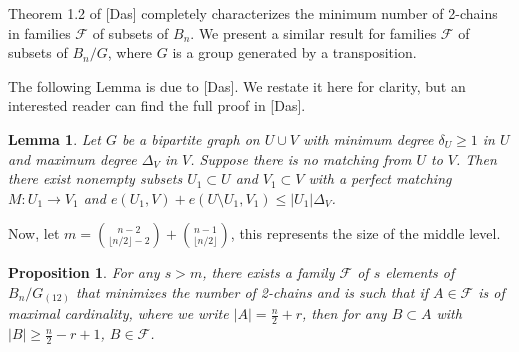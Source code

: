 \documentclass[12pt]{article}
\theoremstyle{plain}
\newtheorem{lemma}[theorem]{Lemma}
\newtheorem{proposition}[theorem]{Proposition}
\theoremstyle{definition}
\theoremstyle{remark}
\newcommand{\F}{\mathcal{F}}
\begin{document}

Theorem 1.2 of [Das] completely characterizes the minimum number of 2-chains in families $\F$ of subsets of $B_n$. We present a similar result for families $\F$ of subsets of $B_n / G$, where $G$ is a group generated by a transposition.


The following Lemma is due to [Das]. We restate it here for clarity, but an interested reader can find the full proof in [Das].

\begin{lemma}
\label{lemma2}
Let $G$ be a bipartite graph on $U \cup V$ with minimum degree $\delta_U \geq 1$ in $U$ and maximum degree $\Delta_V$ in $V$. Suppose there is no matching from $U$ to $V$. Then there exist nonempty subsets $U_1 \subset U$ and $V_1 \subset V$ with a perfect matching $M: U_1 \to V_1$ and $e(U_1,V) + e(U \setminus U_1,V_1) \leq |U_1| \Delta_V$.
\end{lemma}

Now, let $m = \binom{n-2}{\lfloor n/2 \rfloor -2} + \binom{n-1}{\lfloor n/2 \rfloor}$, this represents the size of the middle level.

\begin{proposition}
\label{proposition1} For any $s > m$, there exists a family $\F$ of $s$ elements of $B_n / G_{(12)}$ that minimizes the number of 2-chains and is such that if $A \in \F$ is of maximal cardinality, where we write $|A| = \frac{n}{2}+r$, then for any $B \subset A$ with $|B| \geq \frac{n}{2} - r + 1$, $B \in \F$.
\end{proposition}
\end{document}
